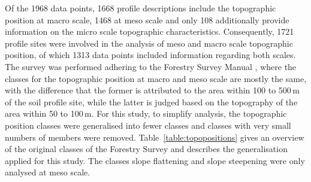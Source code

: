\documentclass[preprint,12pt,authoryear]{elsarticle}
\begin{document}
Of the 1968 data points, 1668 profile descriptions include  the topographic position at macro scale, 1468 at meso scale and only 108 additionally provide information on the micro scale topographic characteristics. Consequently, 1721 profile sites were involved in the analysis of meso and macro scale topographic position, of which 1313 data points included information regarding both scales. The survey was performed adhering to the Forestry Survey Manual \citep{Englisch1998}, where the classes for the topographic position at macro and meso scale are mostly the same, with the difference that the former is attributed to the area within 100 to 500\,m of the soil profile site, while the latter is judged based on the topography of the area within 50 to 100\,m. For this study, to simplify  analysis, the topographic position classes were generalised into fewer classes and classes with very small numbers of members were removed. Table~\ref{table:topopositions} gives an overview of the original classes of the Forestry Survey and describes the generalisation applied for this study. The classes slope flattening and slope steepening were only analysed at meso scale.
\end{document}

